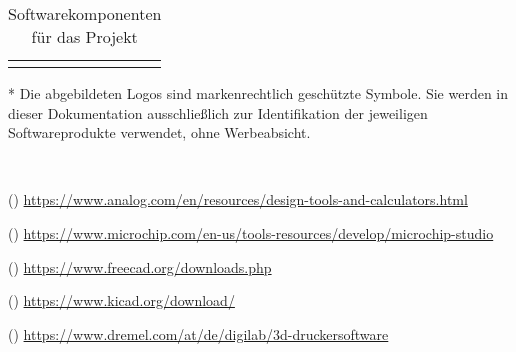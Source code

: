 \begin{table}[!ht]
\begin{threeparttable}
\begin{tabularx}{\linewidth}{|M{2.4cm}|M{2.2cm}|X|}
\fi
    \end{tabularx}
    \caption{Softwarekomponenten für das Projekt}
    \label{tab:software-programme}
    \begin{tablenotes}
      \footnotesize
      \item[*] Die abgebildeten Logos sind markenrechtlich geschützte Symbole. Sie werden in dieser Dokumentation ausschließlich zur Identifikation der jeweiligen Softwareprodukte verwendet, ohne Werbeabsicht.
      \item[~]
\setcounter{softwaretnotecounter}{0}
\ifsoftwarepagelineartechnology
      \item[(\thesoftwaretnotecounter)] \url{https://www.analog.com/en/resources/design-tools-and-calculators.html}
\fi
\ifsoftwarepagemicrochipstudio
      \item[(\thesoftwaretnotecounter)] \url{https://www.microchip.com/en-us/tools-resources/develop/microchip-studio}
\fi
\ifsoftwarepagefreecad
      \item[(\thesoftwaretnotecounter)] \url{https://www.freecad.org/downloads.php}
\fi
\ifsoftwarepagekicad
      \item[(\thesoftwaretnotecounter)] \url{https://www.kicad.org/download/}
\fi
\ifsoftwarepagedremeldigilabslicer
      \item[(\thesoftwaretnotecounter)] \url{https://www.dremel.com/at/de/digilab/3d-druckersoftware}  
\fi
    \end{tablenotes}
  \end{threeparttable}
\end{table}